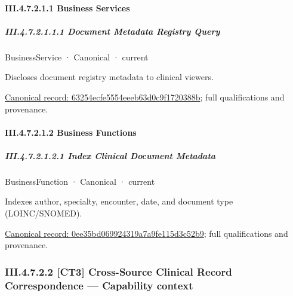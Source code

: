 \paragraph*{III.4.7.2.1.1 Business Services}
\label{navigation:III.4.7.2.1.1}

\subparagraph*{III.4.7.2.1.1.1 Document Metadata Registry Query}
\label{navigation:III.4.7.2.1.1.1}

\label{element:63254ecfe5554eeeb63d0c9f1720388b}
{\small BusinessService · Canonical · current}\par

Discloses document registry metadata to clinical viewers.


{\footnotesize \href{../../../../continuum/business/business-service/63254ecfe5554eeeb63d0c9f1720388b.md}{Canonical record: 63254ecfe5554eeeb63d0c9f1720388b}; full qualifications and provenance.}\par
\paragraph*{III.4.7.2.1.2 Business Functions}
\label{navigation:III.4.7.2.1.2}

\subparagraph*{III.4.7.2.1.2.1 Index Clinical Document Metadata}
\label{navigation:III.4.7.2.1.2.1}

\label{element:0ee35bd069924319a7a9fe115d3c52b9}
{\small BusinessFunction · Canonical · current}\par

Indexes author, specialty, encounter, date, and document type (LOINC/SNOMED).


{\footnotesize \href{../../../../continuum/business/business-function/0ee35bd069924319a7a9fe115d3c52b9.md}{Canonical record: 0ee35bd069924319a7a9fe115d3c52b9}; full qualifications and provenance.}\par
\subsubsection*{III.4.7.2.2 [CT3] Cross-Source Clinical Record Correspondence — Capability context}
\label{navigation:III.4.7.2.2}

